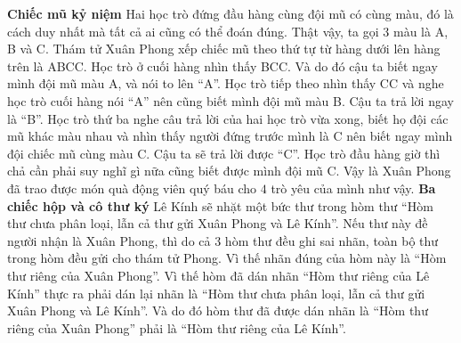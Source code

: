 \vskip 0.1cm
\textbf{\color{gocco}Chiếc mũ kỷ niệm} 
\vskip 0.1cm
Hai học trò đứng đầu hàng cùng đội mũ có cùng màu, đó là cách duy nhất mà tất cả ai cũng có thể đoán đúng.
\vskip 0.1cm
Thật vậy, ta gọi $3$ màu là A, B và C. Thám tử Xuân Phong xếp chiếc mũ theo thứ tự từ hàng dưới lên hàng trên là ABCC. Học trò ở cuối hàng nhìn thấy BCC. Và do đó cậu ta biết ngay mình đội mũ màu A, và nói to lên “A”.
\vskip 0.1cm
Học trò tiếp theo nhìn thấy CC và nghe học trò cuối hàng nói “A” nên cũng biết mình đội mũ màu B. Cậu ta trả lời ngay là “B”.
\vskip 0.1cm
Học trò thứ ba nghe câu trả lời của hai học trò vừa xong, biết họ đội các mũ khác màu nhau và nhìn thấy người đứng trước mình là C nên biết ngay mình đội chiếc mũ cùng màu C. Cậu ta sẽ trả lời được “C”.
\vskip 0.1cm
Học  trò đầu hàng giờ thì chả cần phải suy nghĩ gì nữa cũng biết được mình đội mũ C. Vậy là Xuân Phong đã trao được món quà động viên quý báu cho $4$ trò yêu của mình như vậy.
\vskip 0.1cm
\textbf{\color{toanhocdoisong}Ba chiếc hộp và cô thư ký}
\vskip 0.1cm
Lê Kính sẽ nhặt một bức thư trong hòm thư “Hòm thư chưa phân loại, lẫn cả thư gửi Xuân Phong và Lê Kính”. Nếu thư này đề người nhận là Xuân Phong, thì do cả $3$ hòm thư đều ghi sai nhãn, toàn bộ thư trong hòm đều gửi cho thám tử Phong. Vì thế nhãn đúng của hòm này là “Hòm thư riêng của Xuân Phong”.
\vskip 0.1cm
Vì thế hòm đã dán nhãn “Hòm thư riêng của Lê Kính” thực ra phải dán lại nhãn là “Hòm thư chưa phân loại, lẫn cả thư gửi Xuân Phong và Lê Kính”.
\vskip 0.1cm
Và do đó hòm thư đã được dán nhãn là “Hòm thư riêng của Xuân Phong” phải là “Hòm thư riêng của Lê Kính”.
\vskip 0.1cm

